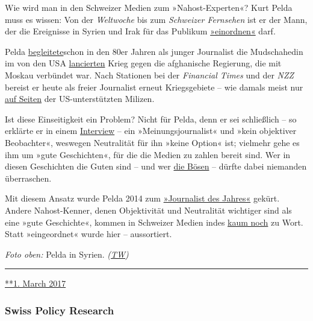 Wie wird man in den Schweizer Medien zum »Nahost-Experten«? Kurt Pelda
muss es wissen: Von der \emph{Welt­woche} bis zum \emph{Schwei­zer
Fern­se­hen} ist er der Mann, der die Ereig­nisse in Sy­ri­en und Irak
für das Publi­kum
\href{http://www.srf.ch/news/international/assad-ist-nur-noch-an-der-macht-weil-er-so-brutal-ist}{»ein­ord­nen«}
darf.

Pelda
\href{https://www.youtube.com/watch?v=dtV25eIECKY}{be­glei­tete}schon in
den 80er Jahren als junger Journa­list die Mudschahedin im von den USA
\href{https://www.voltairenet.org/article165889.html}{lancier­ten} Krieg
gegen die afgha­nische Regie­rung, die mit Moskau verbün­det war. Nach
Sta­tionen bei der \emph{Financial Times} und der \emph{NZZ} bereist er
heute als freier Journa­list erneut Kriegs­ge­biete -- wie damals meist
nur
\href{https://tageswoche.ch/politik/ein-basler-im-syrischen-kampfgebiet/}{auf
Seiten} der US-unter­stützten Milizen.

Ist diese Ein­seitig­keit ein Pro­blem? Nicht für Pelda, denn er sei
schließ­lich -- so erklärte er in einem
\href{https://www.tageswoche.ch/de/2014_36/international/667493/}{Interview}
-- ein »Mei­nungs­jour­na­list« und »kein objek­ti­ver Be­obach­ter«,
wes­wegen Neutra­li­tät für ihn »keine Option« ist; viel­mehr gehe es
ihm um »gute Ge­schich­ten«, für die die Medien zu zahlen be­reit sind.
Wer in diesen Ge­schich­ten die Guten sind -- und wer
\href{http://www.srf.ch/news/international/assad-ist-nur-noch-an-der-macht-weil-er-so-brutal-ist}{die
Bösen} -- dürf‌te dabei niemanden über­raschen.

Mit diesem Ansatz wurde Pelda 2014 zum
\href{http://www.srf.ch/news/panorama/kurt-pelda-ist-journalist-des-jahres}{»Jour­na­list
des Jahres«} gekürt. Andere Nahost-Ken­ner, denen Objek­ti­vi­tät und
Neutra­lität wich­ti­ger sind als eine »gute Ge­schichte«, kommen in
Schwei­zer Medien indes
\href{https://swprs.org/das-gewuenschte-narrativ-ii/}{kaum noch} zu
Wort. Statt »ein­ge­ordnet« wurde hier -- aus­sor­tiert.

\emph{Foto oben:} Pelda in Syrien.
\emph{(\href{https://tageswoche.ch/politik/ein-basler-im-syrischen-kampfgebiet/}{TW})}

\begin{center}\rule{0.5\linewidth}{\linethickness}\end{center}

\href{https://swprs.org/2017/03/01/der-kriegsreporter/}{**1. March 2017}

\hypertarget{swiss-policy-research}{%
\subsubsection{Swiss Policy Research}\label{swiss-policy-research}}

